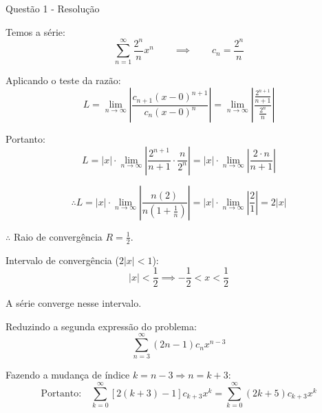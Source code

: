 \documentclass[8pt,aspectratio = 169]{beamer}
\begin{document}
\begin{frame}[allowframebreaks]{Questão 1 - Resolução}

    Temos a série:
    \[ 
    \sum_{n=1}^{\infty} \frac{2^n}{n} x^n \qquad \implies \qquad c_n = \frac{2^n}{n} 
    \]

    Aplicando o teste da razão:
    \[ 
    L =  \lim_{n \to \infty} \left| \frac{c_{n+1} (x-0)^{n+1}}{c_n (x-0)^n} \right| = \lim_{n \to \infty} \left| \frac{\frac{2^{n+1}}{n+1}}{\frac{2^n}{n}} \right| 
    \]

    Portanto:
    \[ 
    L = |x| \cdot \lim_{n \to \infty} \left| \frac{2^{n+1}}{n+1} \cdot \frac{n}{2^n} \right| = |x| \cdot \lim_{n \to \infty} \left| \frac{2 \cdot n}{n+1} \right| 
    \]

    \[ 
    \therefore L = |x| \cdot \lim_{n \to \infty} \left| \frac{n(2)}{n(1 + \frac{1}{n})} \right| = |x| \cdot \lim_{n \to \infty} \left| \frac{2}{1} \right| = 2|x| 
    \]

    $\therefore$ Raio de convergência $R = \frac{1}{2}$.

    \framebreak 

    Intervalo de convergência ($2|x| < 1$):
    \[ 
    |x| < \frac{1}{2} \implies -\frac{1}{2} < x < \frac{1}{2} 
    \]
    
    A série converge nesse intervalo.

    \vspace{0.5cm}
    \begin{center}
    \end{center}
    \vspace{0.5cm}

    \framebreak 

    Reduzindo a segunda expressão do problema: 
    \[
    \sum_{n=3}^{\infty} (2n - 1)c_n x^{n-3}
    \]
    
    Fazendo a mudança de índice $k = n - 3 \Rightarrow n = k + 3$:
    \[
    \text{Portanto:} \quad
    \sum_{k=0}^{\infty} [2(k+3) - 1] c_{k+3} x^k = \sum_{k=0}^{\infty} (2k + 5) c_{k+3} x^k
    \]

\end{frame}
\end{document}
